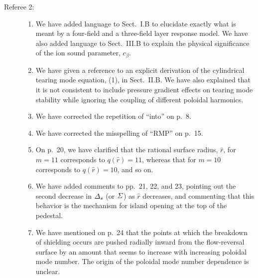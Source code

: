 \documentclass{article}[12pt]
\begin{document}
\begin{description}
\item[Referee 2:]

\begin{enumerate}
\item We have added language to Sect.~I.B to elucidate exactly what is meant by a four-field and a three-field layer response model. We have also
added language to Sect.~III.B to explain the physical significance of the ion sound parameter, $c_\beta$. 

\item We have given a reference to an explicit derivation of the cylindrical tearing mode equation, (1), in Sect.~II.B. We have also explained that it
is not consistent to include pressure gradient effects on tearing mode stability while ignoring the coupling of different poloidal harmonics. 

\item We have corrected the repetition of ``into'' on p.~8.

\item We have corrected the misspelling of ``RMP'' on p.~15.

\item On p.~20, we have clarified that the rational surface radius, $\hat{r}$, for $m=11$ corresponds to $q(\hat{r})=11$, whereas that for
$m=10$ corresponds to $q(\hat{r})=10$, and so on.

\item We have added comments to pp.~21, 22, and 23, pointing out the second decrease in ${\mit\Delta}_s$ (or ${\mit\Sigma}$) as $\hat{r}$ decreases, and
commenting that this behavior is the mechanism for island opening at the top of the pedestal. 

\item We have mentioned on p.~24 that the points at which the breakdown of shielding occurs are pushed radially inward from the flow-reversal
surface by an amount that seems to increase with increasing poloidal mode number. The origin of the poloidal mode number dependence is unclear. 

\end{enumerate}
\end{description}
\end{document}
